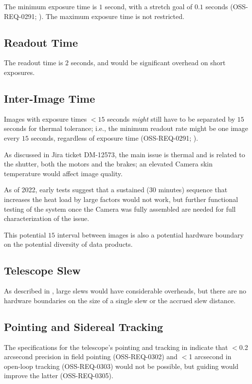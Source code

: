 The minimum exposure time is $1$ second, with a stretch goal of $0.1$ seconds 
(OSS-REQ-0291; ). 
The maximum exposure time is not restricted.

\subsection{Readout Time}

The readout time is $2$ seconds, and would be significant overhead on short exposures.

\subsection{Inter-Image Time}

Images with exposure times $<15$ seconds {\it might} still have to be separated by $15$ 
seconds for thermal tolerance; i.e., the minimum readout rate might be one image every 
$15$ seconds, regardless of exposure time (OSS-REQ-0291; ).

As discussed in Jira ticket DM-12573, the main issue is thermal and is related to the 
shutter, both the motors and the brakes; an elevated Camera skin temperature would affect 
image quality.

As of 2022, early tests suggest that a sustained (30 minutes) sequence that increases the 
heat load by large factors would not work, but further functional testing of the system 
once the Camera was fully assembled are needed for full characterization of the issue.

This potential $15$ interval between images is also a potential hardware boundary on the 
potential diversity of data products.

\subsection{Telescope Slew}

As described in , large slews would have considerable overheads, 
but there are no hardware boundaries on the size of a single slew or the accrued slew 
distance.

\subsection{Pointing and Sidereal Tracking}

The specifications for the telescope's pointing and tracking in  indicate 
that $<$0.2 arcsecond precision in field pointing (OSS-REQ-0302) and $<$1 arcsecond in 
open-loop tracking (OSS-REQ-0303) would not be possible, but guiding would improve the 
latter (OSS-REQ-0305).

